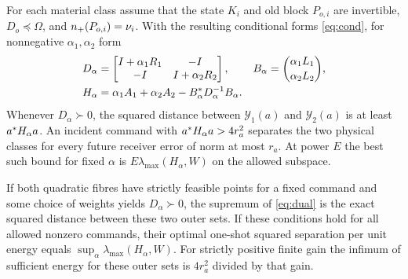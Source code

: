 \begin{theorem}\label{thm:power}
For each material class assume that the state $K_i$ and old block $P_{o,i}$ are invertible, $D_o\preceq\Omega$, and $\nplus(P_{o,i})=\nu_i$. With the resulting conditional forms \eqref{eq:cond}, for nonnegative $\alpha_1,\alpha_2$ form
\begin{align}
 D_\alpha&=\begin{bmatrix} I+\alpha_1R_1&-I\\-I&I+\alpha_2R_2\end{bmatrix},
 &B_\alpha&=\binom{\alpha_1 L_1}{\alpha_2 L_2},\notag\\
 H_\alpha&=\alpha_1 A_1+\alpha_2 A_2-B_\alpha\HH D_\alpha^{-1}B_\alpha .
                                                               \label{eq:dual}
\end{align}
Whenever $D_\alpha\succ0$, the squared distance between $\mathcal Y_1(a)$ and $\mathcal Y_2(a)$ is at least $a\HH H_\alpha a$. An incident command with $a\HH H_\alpha a>4r_a^2$ separates the two physical classes for every future receiver error of norm at most $r_a$. At power $E$ the best such bound for fixed $\alpha$ is $E\lambda_{\max}(H_\alpha,W)$ on the allowed subspace.

If both quadratic fibres have strictly feasible points for a fixed command and some choice of weights yields $D_\alpha\succ0$, the supremum of \eqref{eq:dual} is the exact squared distance between these two outer sets. If these conditions hold for all allowed nonzero commands, their optimal one-shot squared separation per unit energy equals $\sup_\alpha\lambda_{\max}(H_\alpha,W)$. For strictly positive finite gain the infimum of sufficient energy for these outer sets is $4r_a^2$ divided by that gain.
\end{theorem}
